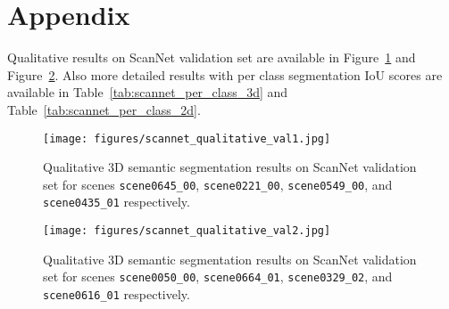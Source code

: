 \documentclass[runningheads]{llncs}
\begin{document}
\section{Appendix}\label{sec:appendix}

Qualitative results on ScanNet validation set are available in Figure~\ref{fig:qualitative_scannet_val1} and Figure~\ref{fig:qualitative_scannet_val2}. Also more detailed results with per class segmentation IoU scores are available in Table~\ref{tab:scannet_per_class_3d} and Table~\ref{tab:scannet_per_class_2d}.

\begin{figure}
\texttt{[image: figures/scannet\_qualitative\_val1.jpg]}
\caption{Qualitative 3D semantic segmentation results on ScanNet validation set for scenes \texttt{scene0645\_00}, \texttt{scene0221\_00}, \texttt{scene0549\_00}, and \texttt{scene0435\_01} respectively.}
\label{fig:qualitative_scannet_val1}
\end{figure}

\begin{figure}
\texttt{[image: figures/scannet\_qualitative\_val2.jpg]}
\caption{Qualitative 3D semantic segmentation results on ScanNet validation set for scenes \texttt{scene0050\_00}, \texttt{scene0664\_01}, \texttt{scene0329\_02}, and \texttt{scene0616\_01} respectively.}
\label{fig:qualitative_scannet_val2}
\end{figure}
\end{document}
